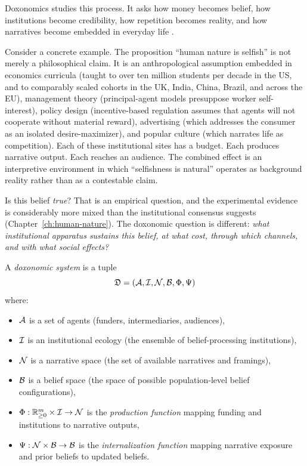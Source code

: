 Doxonomics studies this process.
It asks how money becomes belief, how institutions become credibility, how repetition becomes reality, and how narratives become embedded in everyday life \autocite{bourdieu1991, herman1988}.

Consider a concrete example.
The proposition ``human nature is selfish'' is not merely a philosophical claim.
It is an anthropological assumption embedded in economics curricula (taught to over ten million students per decade in the US, and to comparably scaled cohorts in the UK, India, China, Brazil, and across the EU), management theory (principal-agent models presuppose worker self-interest), policy design (incentive-based regulation assumes that agents will not cooperate without material reward), advertising (which addresses the consumer as an isolated desire-maximizer), and popular culture (which narrates life as competition).
Each of these institutional sites has a budget.
Each produces narrative output.
Each reaches an audience.
The combined effect is an interpretive environment in which ``selfishness is natural'' operates as background reality rather than as a contestable claim.

Is this belief \emph{true}?
That is an empirical question, and the experimental evidence is considerably more mixed than the institutional consensus suggests (Chapter~\ref{ch:human-nature}).
The doxonomic question is different: \emph{what institutional apparatus sustains this belief, at what cost, through which channels, and with what social effects?}

\begin{definition}
\label{def:doxonomic-system}
A \emph{doxonomic system} is a tuple
\[
  \mathfrak{D} = (\mathcal{A}, \mathcal{I}, \mathcal{N}, \mathcal{B}, \Phi, \Psi)
\]
where:
\begin{itemize}[nosep]
  \item $\mathcal{A}$ is a set of agents (funders, intermediaries, audiences),
  \item $\mathcal{I}$ is an institutional ecology (the ensemble of belief-processing institutions),
  \item $\mathcal{N}$ is a narrative space (the set of available narratives and framings),
  \item $\mathcal{B}$ is a belief space (the space of possible population-level belief configurations),
  \item $\Phi: \mathbb{R}^m_{\geq 0} \times \mathcal{I} \to \mathcal{N}$ is the \emph{production function} mapping funding and institutions to narrative outputs,
  \item $\Psi: \mathcal{N} \times \mathcal{B} \to \mathcal{B}$ is the \emph{internalization function} mapping narrative exposure and prior beliefs to updated beliefs.
\end{itemize}
\end{definition}

